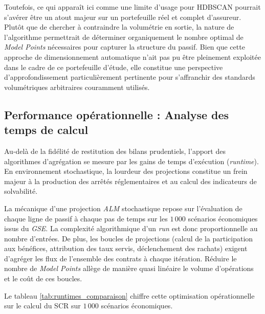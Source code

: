 Toutefois, ce qui apparaît ici comme une limite d'usage pour HDBSCAN pourrait s'avérer être un atout majeur sur un portefeuille réel et complet d'assureur. Plutôt que de chercher à contraindre la volumétrie en sortie, la nature de l'algorithme permettrait de déterminer organiquement le nombre optimal de \textit{Model Points} nécessaires pour capturer la structure du passif. Bien que cette approche de dimensionnement automatique n'ait pas pu être pleinement exploitée dans le cadre de ce portefeuille d'étude, elle constitue une perspective d'approfondissement particulièrement pertinente pour s'affranchir des standards volumétriques arbitraires couramment utilisés.

\subsection{Performance opérationnelle : Analyse des temps de calcul}

Au-delà de la fidélité de restitution des bilans prudentiels, l'apport des algorithmes d'agrégation se mesure par les gains de temps d'exécution (\textit{runtime}). En environnement stochastique, la lourdeur des projections constitue un frein majeur à la production des arrêtés réglementaires et au calcul des indicateurs de solvabilité.

La mécanique d'une projection \textit{ALM} stochastique repose sur l'évaluation de chaque ligne de passif à chaque pas de temps sur les $1\,000$ scénarios économiques issus du \textit{GSE}. La complexité algorithmique d'un \textit{run} est donc proportionnelle au nombre d'entrées. De plus, les boucles de projections (calcul de la participation aux bénéfices, attribution des taux servis, déclenchement des rachats) exigent d'agréger les flux de l'ensemble des contrats à chaque itération. Réduire le nombre de \textit{Model Points} allège de manière quasi linéaire le volume d'opérations et le coût de ces boucles.

Le tableau \ref{tab:runtimes_comparaison} chiffre cette optimisation opérationnelle sur le calcul du SCR sur $1\,000$ scénarios économiques.

